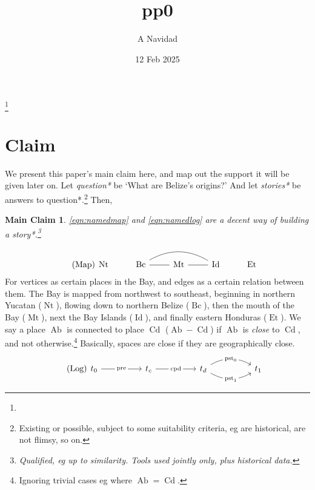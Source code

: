 \documentclass{amsart}
\newcommand{\ment}[1]{\textit{#1}} %
\DeclareMathOperator{\ab}{Ab} %
\DeclareMathOperator{\cd}{Cd} %
\DeclareMathOperator{\id}{Id} %
\DeclareMathOperator{\mt}{Mt} %
\DeclareMathOperator{\bc}{Bc} %
\DeclareMathOperator{\et}{Et} %
\DeclareMathOperator{\nt}{Nt} %
\DeclareMathOperator{\pre}{pre} %
\DeclareMathOperator{\pst}{pst} %
\DeclareMathOperator{\cpd}{cpd} %
\newtheorem{mainclm}{Main Claim} %
\theoremstyle{definition}
\theoremstyle{remark}
\begin{document}
%
%
\title{pp0}
\author{A Navidad}
\address{Harvard College, Cambridge MA, US}
\date{12 Feb 2025}
\thanks{} %
\begin{abstract}
\end{abstract}
\keywords{}
\maketitle
%
%
%
\section{Claim}
\label{s:claim}
	We present this paper's main claim here, and map out the support it will be given later on. Let \ment{question*} be `What are Belize's origins?' And let \ment{stories*} be answers to question*.\footnote{Existing or possible, subject to some suitability criteria, eg are historical, are not flimsy, so on.} Then,
	\begin{mainclm}
	\label{clm:maindecency}
	\ref{eqn:namedmap} and \ref{eqn:namedlog} are a decent way of building a story*.\footnote{Qualified, eg up to similarity. Tools used jointly only, plus historical data.}
	\end{mainclm}
	\begin{equation}
	\tag{Map}
	\label{eqn:namedmap}
		\begin{tikzcd}[arrows=dash]
		\nt &\bc \rar \ar[rr,bend left] &\mt \rar &\id &\et
		\end{tikzcd}
	\end{equation}
	For vertices as certain places in the Bay, and edges as a certain relation between them. The Bay is mapped from northwest to southeast, beginning in northern Yucatan (\(\nt\)), flowing down to northern Belize (\(\bc\)), then the mouth of the Bay (\(\mt\)), next the Bay Islands (\(\id\)), and finally eastern Honduras (\(\et\)). We say a place \(\ab\) is connected to place \(\cd\) (\(\ab-\cd\)) if \(\ab\) is \ment{close} to \(\cd\), and not otherwise.\footnote{Ignoring trivial cases eg where \(\ab=\cd\).} Basically, spaces are close if they are geographically close.
	\begin{equation}
	\tag{Log}
	\label{eqn:namedlog}
		\begin{tikzcd}[sep=huge]
		t_0 \rar["\pre" description] &t_c \rar["\cpd" description] &t_d \rar[bend left,"\pst_0" description] \rar[bend right,"\pst_1" description] &t_1
		\end{tikzcd}
	\end{equation}
\end{document}
